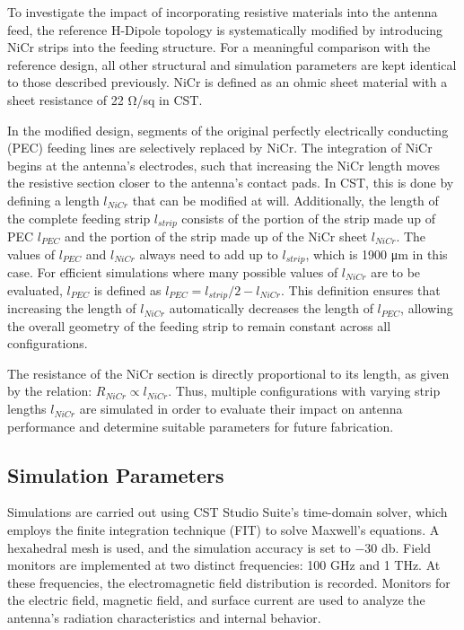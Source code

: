 To investigate the impact of incorporating resistive materials into the antenna feed, the reference H-Dipole topology is systematically modified by introducing NiCr strips into the feeding structure. For a meaningful comparison with the reference design, all other structural and simulation parameters are kept identical to those described previously.
NiCr is defined as an ohmic sheet material with a sheet resistance of \num{22} \si{\ohm/sq} in CST.

In the modified design, segments of the original perfectly electrically conducting (PEC) feeding lines are selectively replaced by NiCr. The integration of NiCr begins at the antenna’s electrodes, such that increasing the NiCr length moves the resistive section closer to the antenna’s contact pads. In CST, this is done by defining a length $l_{NiCr}$ that can be modified at will. Additionally, the length of the complete feeding strip $l_{strip}$ consists of the portion of the strip made up of PEC $l_{PEC}$ and the portion of the strip made up of the NiCr sheet $l_{NiCr}$. The values of $l_{PEC}$ and $l_{NiCr}$ always need to add up to $l_{strip}$, which is \num{1900} \si{\micro\meter} in this case. For efficient simulations where many possible values of $l_{NiCr}$ are to be evaluated, $l_{PEC}$ is defined as $l_{PEC} = l_{strip}/2 - l_{NiCr}$. This definition ensures that increasing the length of $l_{NiCr}$ automatically decreases the length of $l_{PEC}$, allowing the overall geometry of the feeding strip to remain constant across all configurations.


The resistance of the NiCr section is directly proportional to its length, as given by the relation: $R_{NiCr} \propto l_{NiCr}$. Thus, multiple configurations with varying strip lengths $l_{NiCr}$ are simulated in order to evaluate their impact on antenna performance and determine suitable parameters for future fabrication.

\subsection{Simulation Parameters}

Simulations are carried out using CST Studio Suite’s time-domain solver, which employs the finite integration technique (FIT) to solve Maxwell’s equations. A hexahedral mesh is used, and the simulation accuracy is set to \num{-30} \si{\decibel}. Field monitors are implemented at two distinct frequencies: \num{100} \si{\giga\hertz} and \num{1} \si{\tera\hertz}. At these frequencies, the electromagnetic field distribution is recorded. Monitors for the electric field, magnetic field, and surface current are used to analyze the antenna's radiation characteristics and internal behavior.
